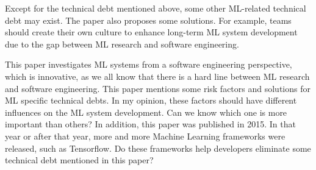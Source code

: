 Except for the technical debt mentioned above, some other ML-related technical debt may exist. The paper also proposes some solutions. For example, teams should create their own culture to enhance long-term ML system development due to the gap between ML research and software engineering.

This paper investigates ML systems from a software engineering perspective, which is innovative, as we all know that there is a hard line between ML research and software engineering. This paper mentions some risk factors and solutions for ML specific technical debts. In my opinion, these factors should have different influences on the ML system development. Can we know which one is more important than others? In addition, this paper was published in 2015. In that year or after that year, more and more Machine Learning frameworks were released, such as Tensorflow. Do these frameworks help developers eliminate some technical debt mentioned in this paper?
